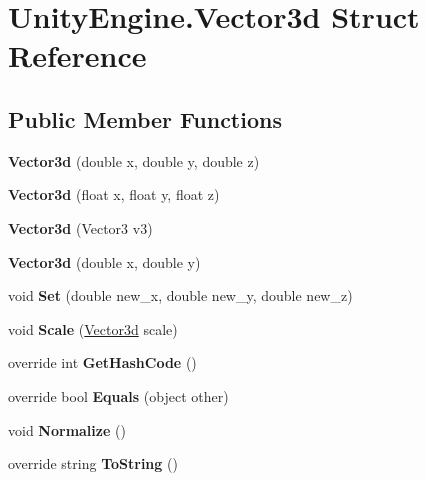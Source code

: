 \hypertarget{struct_unity_engine_1_1_vector3d}{}\section{Unity\+Engine.\+Vector3d Struct Reference}
\label{struct_unity_engine_1_1_vector3d}
\subsection*{Public Member Functions}
\begin{DoxyCompactItemize}
\item 
\mbox{\label{struct_unity_engine_1_1_vector3d_a3743526f0fe72482014117b62ed45c90}} 
{\bfseries Vector3d} (double x, double y, double z)
\item 
\mbox{\label{struct_unity_engine_1_1_vector3d_a620418a1ce20c867b208f1ac0db8327d}} 
{\bfseries Vector3d} (float x, float y, float z)
\item 
\mbox{\label{struct_unity_engine_1_1_vector3d_a8be95a112a4e662b16c019ff5be29a55}} 
{\bfseries Vector3d} (Vector3 v3)
\item 
\mbox{\label{struct_unity_engine_1_1_vector3d_a02d3241c9b857c4647e0c634dc602c1a}} 
{\bfseries Vector3d} (double x, double y)
\item 
\mbox{\label{struct_unity_engine_1_1_vector3d_a21b1dc44b2ccc63821c1ac1f7467f0cd}} 
void {\bfseries Set} (double new\+\_\+x, double new\+\_\+y, double new\+\_\+z)
\item 
\mbox{\label{struct_unity_engine_1_1_vector3d_ad22192035a213ca8022dfc98c1412041}} 
void {\bfseries Scale} (\hyperlink{struct_unity_engine_1_1_vector3d}{Vector3d} scale)
\item 
\mbox{\label{struct_unity_engine_1_1_vector3d_acb727809084d322580684c8eb24acab7}} 
override int {\bfseries Get\+Hash\+Code} ()
\item 
\mbox{\label{struct_unity_engine_1_1_vector3d_abfd4ffa4f51c5b6713f7f833ae8b85a2}} 
override bool {\bfseries Equals} (object other)
\item 
\mbox{\label{struct_unity_engine_1_1_vector3d_a84aec1e9e703eb3286028ed518af4c71}} 
void {\bfseries Normalize} ()
\item 
\mbox{\label{struct_unity_engine_1_1_vector3d_a92880ca24fc30ca5fbfc04a93a99d837}} 
override string {\bfseries To\+String} ()
\end{DoxyCompactItemize}
